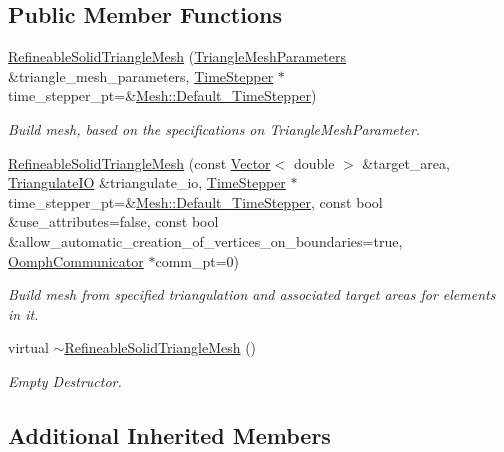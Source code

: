 \subsection*{Public Member Functions}
\begin{DoxyCompactItemize}
\item 
\hyperlink{classoomph_1_1RefineableSolidTriangleMesh_a813f756c2576d7ef129a603f4ac441ba}{Refineable\+Solid\+Triangle\+Mesh} (\hyperlink{classoomph_1_1TriangleMeshParameters}{Triangle\+Mesh\+Parameters} \&triangle\+\_\+mesh\+\_\+parameters, \hyperlink{classoomph_1_1TimeStepper}{Time\+Stepper} $\ast$time\+\_\+stepper\+\_\+pt=\&\hyperlink{classoomph_1_1Mesh_a12243d0fee2b1fcee729ee5a4777ea10}{Mesh\+::\+Default\+\_\+\+Time\+Stepper})
\begin{DoxyCompactList}\small\item\em Build mesh, based on the specifications on Triangle\+Mesh\+Parameter. \end{DoxyCompactList}\item 
\hyperlink{classoomph_1_1RefineableSolidTriangleMesh_ab5924620ada32f8f95be71fd0bc6a110}{Refineable\+Solid\+Triangle\+Mesh} (const \hyperlink{classoomph_1_1Vector}{Vector}$<$ double $>$ \&target\+\_\+area, \hyperlink{structoomph_1_1TriangulateIO}{Triangulate\+IO} \&triangulate\+\_\+io, \hyperlink{classoomph_1_1TimeStepper}{Time\+Stepper} $\ast$time\+\_\+stepper\+\_\+pt=\&\hyperlink{classoomph_1_1Mesh_a12243d0fee2b1fcee729ee5a4777ea10}{Mesh\+::\+Default\+\_\+\+Time\+Stepper}, const bool \&use\+\_\+attributes=false, const bool \&allow\+\_\+automatic\+\_\+creation\+\_\+of\+\_\+vertices\+\_\+on\+\_\+boundaries=true, \hyperlink{classoomph_1_1OomphCommunicator}{Oomph\+Communicator} $\ast$comm\+\_\+pt=0)
\begin{DoxyCompactList}\small\item\em Build mesh from specified triangulation and associated target areas for elements in it. \end{DoxyCompactList}\item 
virtual \hyperlink{classoomph_1_1RefineableSolidTriangleMesh_a8b4ea32b78a6f80536dba20538452e7b}{$\sim$\+Refineable\+Solid\+Triangle\+Mesh} ()
\begin{DoxyCompactList}\small\item\em Empty Destructor. \end{DoxyCompactList}\end{DoxyCompactItemize}
\subsection*{Additional Inherited Members}


